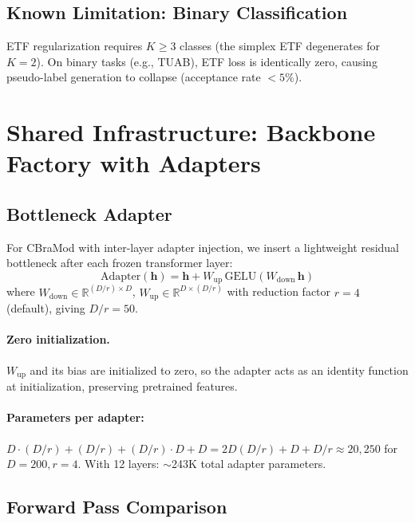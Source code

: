 \documentclass{article}
\newcommand{\R}{\mathbb{R}}
\begin{document}
\subsection{Known Limitation: Binary Classification}

ETF regularization requires $K \geq 3$ classes (the simplex ETF degenerates for $K=2$). On binary tasks (e.g., TUAB), ETF loss is identically zero, causing pseudo-label generation to collapse (acceptance rate $< 5\%$).

\section{Shared Infrastructure: Backbone Factory with Adapters}
\label{sec:factory}

\subsection{Bottleneck Adapter}

For CBraMod with inter-layer adapter injection, we insert a lightweight residual bottleneck after each frozen transformer layer:
\begin{equation}
\text{Adapter}(\bm{h}) = \bm{h} + W_\text{up}\, \text{GELU}(W_\text{down}\, \bm{h})
\end{equation}
where $W_\text{down} \in \R^{(D/r) \times D}$, $W_\text{up} \in \R^{D \times (D/r)}$ with reduction factor $r = 4$ (default), giving $D/r = 50$.

\paragraph{Zero initialization.} $W_\text{up}$ and its bias are initialized to zero, so the adapter acts as an identity function at initialization, preserving pretrained features.

\paragraph{Parameters per adapter:} $D \cdot (D/r) + (D/r) + (D/r) \cdot D + D = 2D(D/r) + D + D/r \approx 20{,}250$ for $D=200, r=4$.
With 12 layers: $\sim$243K total adapter parameters.

\subsection{Forward Pass Comparison}
\end{document}
